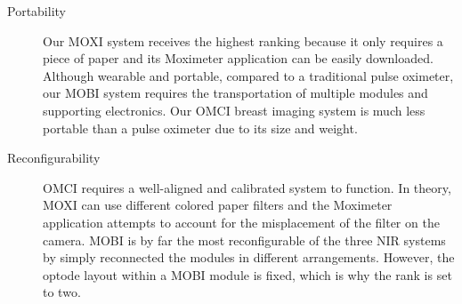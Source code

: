 \begin{description}
   \item[Portability] Our \ac{MOXI} system receives the highest ranking because it only requires a piece of paper and its Moximeter application can be easily downloaded. Although wearable and portable, compared to a traditional pulse oximeter, our \ac{MOBI} system requires the transportation of multiple modules and supporting electronics. Our \ac{OMCI} breast imaging system is much less portable than a pulse oximeter due to its size and weight.
   
   \item[Reconfigurability] \ac{OMCI} requires a well-aligned and calibrated system to function. In theory, \ac{MOXI} can use different colored paper filters and the Moximeter application attempts to account for the misplacement of the filter on the camera. \ac{MOBI} is by far the most reconfigurable of the three \ac{NIR} systems by simply reconnected the modules in different arrangements. However, the optode layout within a \ac{MOBI} module is fixed, which is why the rank is set to two. 
\end{description}
